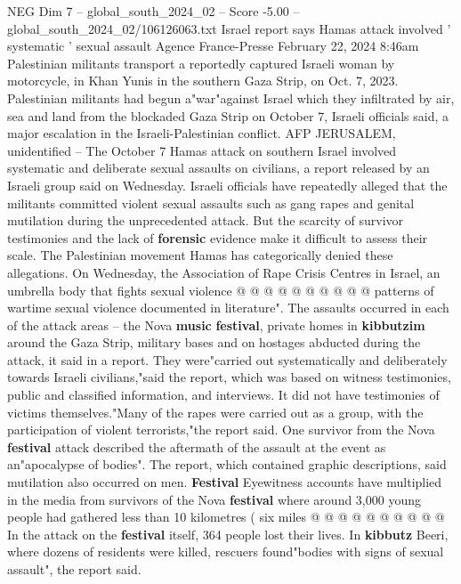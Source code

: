 \begin{textsample}{NEG Dim 7 – global\_south\_2024\_02 – Score -5.00 – global\_south\_2024\_02/106126063.txt}  \label{ex:f7_neg_395}
Israel report says Hamas attack involved ' systematic ' sexual assault Agence France-Presse February 22, 2024 8:46am Palestinian militants transport a reportedly captured Israeli woman by motorcycle, in Khan Yunis in the southern Gaza Strip, on Oct. 7, 2023.
Palestinian militants had begun a"war"against Israel which they infiltrated by air, sea and land from the blockaded Gaza Strip on October 7, Israeli officials said, a major escalation in the Israeli-Palestinian conflict.
AFP JERUSALEM, unidentified -- The October 7 Hamas attack on southern Israel involved systematic and deliberate sexual assaults on civilians, a report released by an Israeli group said on Wednesday.
Israeli officials have repeatedly alleged that the militants committed violent sexual assaults such as gang rapes and genital mutilation during the unprecedented attack.
But the scarcity of survivor testimonies and the lack of \textbf{forensic} evidence make it difficult to assess their scale.
The Palestinian movement Hamas has categorically denied these allegations.
On Wednesday, the Association of Rape Crisis Centres in Israel, an umbrella body that fights sexual violence @ @ @ @ @ @ @ @ @ @ patterns of wartime sexual violence documented in literature".
The assaults occurred in each of the attack areas -- the Nova \textbf{music} \textbf{festival}, private homes in \textbf{kibbutzim} around the Gaza Strip, military bases and on hostages abducted during the attack, it said in a report.
They were"carried out systematically and deliberately towards Israeli civilians,"said the report, which was based on witness testimonies, public and classified information, and interviews.
It did not have testimonies of victims themselves."Many of the rapes were carried out as a group, with the participation of violent terrorists,"the report said.
One survivor from the Nova \textbf{festival} attack described the aftermath of the assault at the event as an"apocalypse of bodies".
The report, which contained graphic descriptions, said mutilation also occurred on men. \textbf{Festival} Eyewitness accounts have multiplied in the media from survivors of the Nova \textbf{festival} where around 3,000 young people had gathered less than 10 kilometres ( six miles @ @ @ @ @ @ @ @ @ @ In the attack on the \textbf{festival} itself, 364 people lost their lives.
In \textbf{kibbutz} Beeri, where dozens of residents were killed, rescuers found"bodies with signs of sexual assault", the report said.

\end{textsample}
